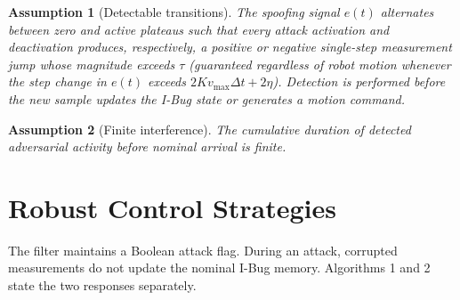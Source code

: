 \documentclass[10pt,a4paper]{article}
\newtheorem{assumption}{Assumption}
\begin{document}
\begin{assumption}[Detectable transitions]
The spoofing signal $e(t)$ alternates between zero and active plateaus such that every attack activation and deactivation produces, respectively, a positive or negative single-step measurement jump whose magnitude exceeds $\tau$ (guaranteed regardless of robot motion whenever the step change in $e(t)$ exceeds $2Kv_{\max}\Delta t + 2\eta$). Detection is performed before the new sample updates the I-Bug state or generates a motion command.
\label{ass:detection}
\end{assumption}

\begin{assumption}[Finite interference]
The cumulative duration of detected adversarial activity before nominal arrival is finite.
\label{ass:finite}
\end{assumption}

\section{Robust Control Strategies}
The filter maintains a Boolean attack flag. During an attack, corrupted measurements do not update the nominal I-Bug memory. Algorithms 1 and 2 state the two responses separately.
\end{document}

